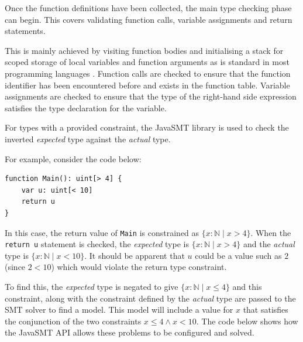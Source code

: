 \documentclass[a4paper]{article}
\begin{document}
    \hfill{}

    Once the function definitions have been collected, the main type checking phase can begin. This covers validating function calls, variable assignments and return statements.
    
    This is mainly achieved by visiting function bodies and initialising a stack for scoped storage of local variables and function arguments as is standard in most programming languages \citep[p. 88]{watt2004programming}. Function calls are checked to ensure that the function identifier has been encountered before and exists in the function table. Variable assignments are checked to ensure that the type of the right-hand side expression satisfies the type declaration for the variable.
   
    
    For types with a provided constraint, the JavaSMT library is used to check the inverted \emph{expected} type against the \emph{actual} type.
    
    For example, consider the code below:
    
\begin{verbatim}
function Main(): uint[> 4] {
    var u: uint[< 10]
    return u
}
\end{verbatim}


    In this case, the return value of \texttt{Main} is constrained as $\{x: \mathbb{N} \mid{} x > 4\}$. When the \texttt{return u} statement is checked, the \emph{expected} type is $\{x: \mathbb{N} \mid{} x > 4\}$ and the \emph{actual} type is $\{x: \mathbb{N} \mid{} x < 10\}$. It should be apparent that $u$ could be a value such as $2$ (since $2 < 10$) which would violate the return type constraint.
    
    To find this, the \emph{expected} type is negated to give $\{x: \mathbb{N} \mid{} x \le 4\}$ and this constraint, along with the constraint defined by the \emph{actual} type are passed to the SMT solver to find a model. This model will include a value for $x$ that satisfies the conjunction of the two constraints $x \le 4 \land x < 10$. The code below shows how the JavaSMT API allows these problems to be configured and solved.
    
\end{document}
